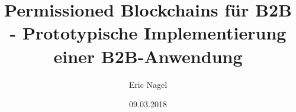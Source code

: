 \documentclass[a4paper,12pt,headsepline]{report}
\title{Permissioned Blockchains für B2B - Prototypische Implementierung einer B2B-Anwendung}
\author{Eric Nagel}
\date{09.03.2018}
\begin{document}

 

 
 
\tableofcontents %

\listoffigures %

\listoftables %

\renewcommand{\lstlistlistingname}{Listingverzeichnis}
\lstlistoflistings

\pagestyle{plain} %


	









			
\end{document}
